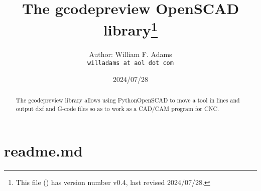 \documentclass{ltxdoc}
\begin{document}

\enlargethispage{\baselineskip}
 
\def\fileversion{v0.4} \def\filedate{2024/07/28}


\def\dtxfile{gcodepreview.dtx}

\title{The gcodepreview OpenSCAD library\thanks{This
        file (\texttt{\jobname}) has version number \fileversion, last revised
        \filedate.}}

\author{%
Author: William F. Adams\\
\texttt{willadams at aol dot com}
}
\date{\filedate}
\maketitle
\begin{abstract}
\noindent The gcodepreview library allows using PythonOpenSCAD to move a tool in lines 
and output dxf and G-code files so as to work as a CAD/\allowbreak CAM program for CNC.
\end{abstract}
\tableofcontents

\clearpage
\section{readme.md}
\end{document}
